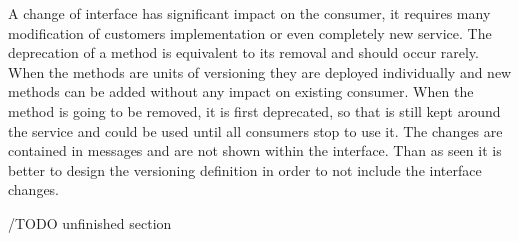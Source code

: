 
A change of interface has significant impact on the consumer, it requires many modification of customers implementation or even completely new service. The deprecation of a method is equivalent to its removal and should occur rarely.
When the methods are units of versioning they are deployed individually and new methods can be added without any impact on existing consumer. When the method is going to be removed, it is first deprecated, so that is still kept around the service and could be used until all consumers stop to use it. The changes are contained in messages and are not shown within the interface.
Than as seen it is better to design the versioning definition in order to not include the interface changes.

/TODO unfinished section



